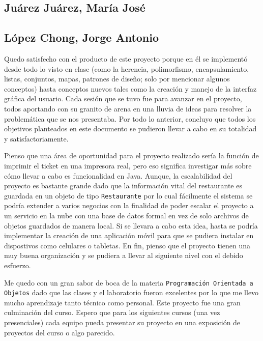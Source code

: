 \newpage

\subsection*{Juárez Juárez, María José}

\newpage

\subsection*{López Chong, Jorge Antonio}
Quedo satisfecho con el producto de este proyecto porque en él se implementó desde todo lo visto en clase
(como la herencia, polimorfismo, encapsulamiento, listas, conjuntos, mapas, patrones de diseño; solo por
mencionar algunos conceptos) hasta conceptos nuevos tales como la creación y manejo de la interfaz
gráfica del usuario. Cada sesión que se tuvo fue para avanzar en el proyecto, todos aportando con su granito
de arena en una lluvia de ideas para resolver la problemática que se nos presentaba. Por todo lo anterior,
concluyo que todos los objetivos planteados en este documento se pudieron llevar a cabo en su totalidad y
satisfactoriamente.

Pienso que una área de oportunidad para el proyecto realizado sería la función de imprimir el ticket en una
impresora real, pero eso significa investigar más sobre cómo llevar a cabo es funcionalidad en Java. Aunque,
la escalabilidad del proyecto es bastante grande dado que la información vital del restaurante es guardada
en un objeto de tipo \texttt{Restaurante} por lo cual fácilmente el sistema se podría extender a varios
negocios con la finalidad de poder escalar el proyecto a un servicio en la nube con una base de datos formal
en vez de solo archivos de objetos guardados de manera local. Si se llevara a cabo esta idea, hasta se podría
implementar la creación de una aplicación móvil para que se pudiera instalar en dispostivos como celulares o
tabletas. En fin, pienso que el proyecto tienen una muy buena organización y se pudiera a llevar al siguiente
nivel con el debido esfuerzo.

Me quedo con un gran sabor de boca de la materia \texttt{Programación Orientada a Objetos} dado que las clases
y el laboratorio fueron excelentes por lo que me llevo mucho aprendizaje tanto técnico como personal. Este proyecto
fue una gran culminación del curso. Espero que para los siguientes cursos (una vez presenciales) cada equipo
pueda presentar su proyecto en una exposición de proyectos del curso o algo parecido.

